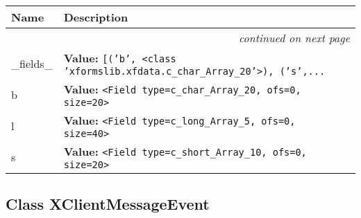     \vspace{-1cm}
\hspace{\varindent}\begin{longtable}{|p{\varnamewidth}|p{\vardescrwidth}|l}
\cline{1-2}
\cline{1-2} \centering \textbf{Name} & \centering \textbf{Description}& \\
\cline{1-2}
\endhead\cline{1-2}\multicolumn{3}{r}{\small\textit{continued on next page}}\\\endfoot\cline{1-2}
\endlastfoot\raggedright \_\-f\-i\-e\-l\-d\-s\-\_\- & \raggedright \textbf{Value:} 
{\tt \texttt{[}\texttt{(}\texttt{'}\texttt{b}\texttt{'}\texttt{, }{\textless}class 'xformslib.xfdata.c\_char\_Array\_20'{\textgreater}\texttt{)}\texttt{, }\texttt{(}\texttt{'}\texttt{s}\texttt{'}\texttt{,}\texttt{...}}&\\
\cline{1-2}
\raggedright b\- & \raggedright \textbf{Value:} 
{\tt {\textless}Field type=c\_char\_Array\_20, ofs=0, size=20{\textgreater}}&\\
\cline{1-2}
\raggedright l\- & \raggedright \textbf{Value:} 
{\tt {\textless}Field type=c\_long\_Array\_5, ofs=0, size=40{\textgreater}}&\\
\cline{1-2}
\raggedright s\- & \raggedright \textbf{Value:} 
{\tt {\textless}Field type=c\_short\_Array\_10, ofs=0, size=20{\textgreater}}&\\
\cline{1-2}
\end{longtable}



\subsection{Class XClientMessageEvent}

